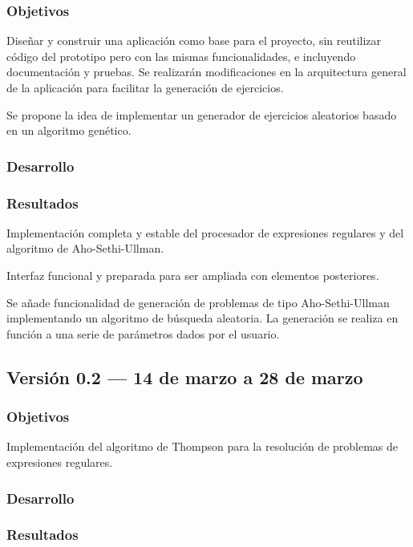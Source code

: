\subsubsection{Objetivos}
Diseñar y construir una aplicación como base para el proyecto, sin reutilizar código del prototipo pero con las mismas funcionalidades, e incluyendo documentación y pruebas.
Se realizarán modificaciones en la arquitectura general de la aplicación para facilitar la generación de ejercicios.

Se propone la idea de implementar un generador de ejercicios aleatorios basado en un algoritmo genético.

\subsubsection{Desarrollo}

\subsubsection{Resultados}
Implementación completa y estable del procesador de expresiones regulares y del algoritmo de Aho-Sethi-Ullman.

Interfaz funcional y preparada para ser ampliada con elementos posteriores.

Se añade funcionalidad de generación de problemas de tipo Aho-Sethi-Ullman implementando un algoritmo de búsqueda aleatoria.
La generación se realiza en función a una serie de parámetros dados por el usuario.

\subsection{Versión 0.2 --- 14 de marzo a 28 de marzo}

\subsubsection{Objetivos}
Implementación del algoritmo de Thompson para la resolución de problemas de expresiones regulares.

\subsubsection{Desarrollo}

\subsubsection{Resultados}

